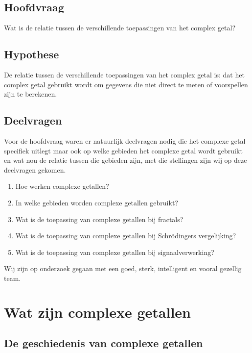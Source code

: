 \documentclass[11pt,fleqn]{book} %
\begin{document}
\section{Hoofdvraag}
Wat is de relatie tussen de verschillende toepassingen van het complex getal? 

\section{Hypothese}
De relatie tussen de verschillende toepassingen van het complex getal is: dat het complex getal gebruikt wordt om gegevens die niet direct te meten of voorspellen zijn te berekenen.

\section{Deelvragen}
Voor de hoofdvraag waren er natuurlijk deelvragen nodig die het complexe getal specifiek uitlegt maar ook op welke gebieden het complexe getal wordt gebruikt en wat nou de relatie tussen die gebieden zijn, met die stellingen zijn wij op deze deelvragen gekomen.

\begin{enumerate}
\item Hoe werken complexe getallen?
\item In welke gebieden worden complexe getallen gebruikt?
\item Wat is de toepassing van complexe getallen bij fractals?
\item Wat is de toepassing van complexe getallen bij Schrödingers vergelijking?
\item Wat is de toepassing van complexe getallen bij signaalverwerking? 
\end{enumerate}

Wij zijn op onderzoek gegaan met een goed, sterk, intelligent en vooral gezellig team.


\chapter{Wat zijn complexe getallen}

\section{De geschiedenis van complexe getallen}
\end{document}
